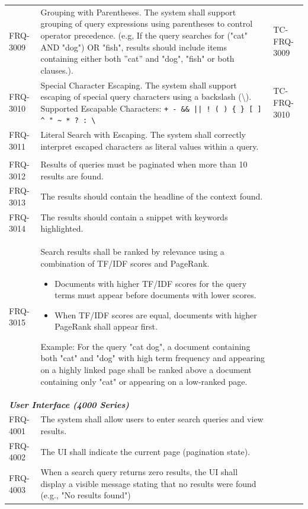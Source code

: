 \documentclass{article}
\begin{document}
\begin{longtable}{@{}p{1.7cm} p{9cm} p{4.5cm}@{}}
FRQ-3009 & Grouping with Parentheses. The system shall support grouping of query expressions using parentheses to control operator precedence. \newline
            (e.g, If the query searches for ("cat" AND "dog") OR "fish", results should include items containing either both ”cat” and "dog", "fish" or both clauses.). & TC-FRQ-3009\\


FRQ-3010 & Special Character Escaping. The system shall support escaping of special query characters using a backslash (\textbackslash). \newline
            Supported Escapable Characters: \newline \texttt{+ - \&\& || ! ( ) \{ \} [ ] \^{} " \textasciitilde{} * ? : \textbackslash} & TC-FRQ-3010 \\
FRQ-3011 & Literal Search with Escaping. The system shall correctly interpret escaped characters as literal values within a query. & \\


                       & \\
FRQ-3012 & Results of queries must be paginated when more than 10 results are found. & \\
FRQ-3013 & The results should contain the headline of the context found. & \\
FRQ-3014 & The results should contain a snippet with keywords highlighted. & \\
FRQ-3015 & Search results shall be ranked by relevance using a combination of TF/IDF scores and PageRank. \newline
\begin{itemize}
 \item Documents with higher TF/IDF scores for the query terms must appear before documents with lower scores. 
 \item When TF/IDF scores are equal, documents with higher PageRank shall appear first. 
\end{itemize}


Example:    For the query "cat dog", a document containing both "cat" and "dog" with high term frequency 
            and appearing on a highly linked page shall be ranked above a document containing only "cat" 
            or appearing on a low-ranked page. & \\


\midrule
\multicolumn{3}{l}{\textbf{\textit{User Interface (4000 Series)}}} \\
\midrule
FRQ-4001 & The system shall allow users to enter search queries and view results. & \\
FRQ-4002 & The UI shall indicate the current page (pagination state). & \\
FRQ-4003 & When a search query returns zero results, the UI shall display a visible message stating 
            that no results were found (e.g., "No results found") & \\

\end{longtable}
\newpage
\end{document}
